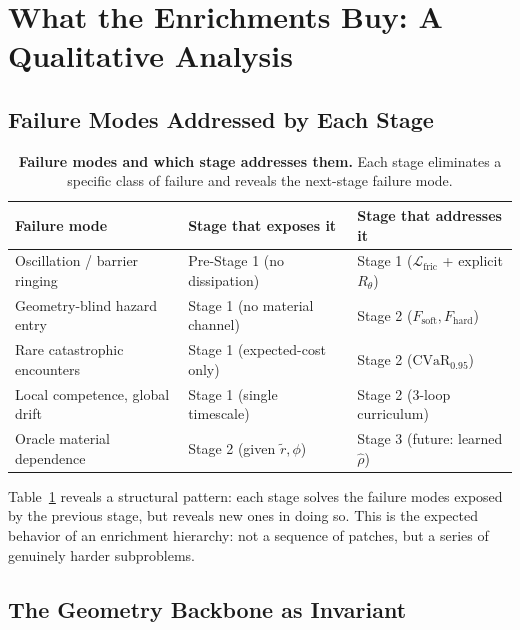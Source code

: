 \section{What the Enrichments Buy: A Qualitative Analysis}
\label{sec:ch5:qualitative}

\subsection{Failure Modes Addressed by Each Stage}
\label{subsec:ch5:failure}

\begin{table}[t]
\centering
\caption{%
  \textbf{Failure modes and which stage addresses them.}
  Each stage eliminates a specific class of failure and reveals the
  next-stage failure mode.
}
\label{tab:ch5:failures}
\small
\setlength{\tabcolsep}{5pt}
\renewcommand{\arraystretch}{1.3}
\begin{tabular}{lll}
\toprule
\textbf{Failure mode} & \textbf{Stage that exposes it} &
\textbf{Stage that addresses it} \\
\midrule
Oscillation / barrier ringing & Pre-Stage 1 (no dissipation) &
Stage 1 ($\mathcal{L}_{\mathrm{fric}}$ + explicit $R_\theta$) \\
Geometry-blind hazard entry & Stage 1 (no material channel) &
Stage 2 ($F_{\mathrm{soft}}, F_{\mathrm{hard}}$) \\
Rare catastrophic encounters & Stage 1 (expected-cost only) &
Stage 2 ($\mathrm{CVaR}_{0.95}$) \\
Local competence, global drift & Stage 1 (single timescale) &
Stage 2 (3-loop curriculum) \\
Oracle material dependence & Stage 2 (given $\tilde{r}, \phi$) &
Stage 3 (future: learned $\hat\rho$) \\
\bottomrule
\end{tabular}
\end{table}

Table~\ref{tab:ch5:failures} reveals a structural pattern: each stage
solves the failure modes exposed by the previous stage, but reveals
new ones in doing so.
This is the expected behavior of an enrichment hierarchy: not a
sequence of patches, but a series of genuinely harder subproblems.

\subsection{The Geometry Backbone as Invariant}
\label{subsec:ch5:invariant}

